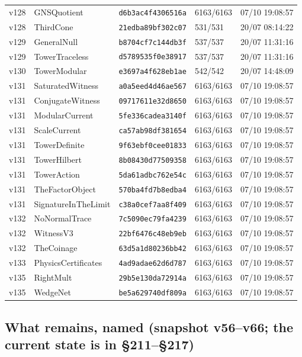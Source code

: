 \documentclass[11pt]{article}
\theoremstyle{definition}\newtheorem{deriv}{Derivation}
\begin{document}
{\begin{longtable}{@{}lllll@{}}
v128 & GNSQuotient & \texttt{d6b3ac4f4306516a} & 6163/6163 & 07/10 19:08:57 \\
v128 & ThirdCone & \texttt{21edba89bf302c07} & 531/531 & 20/07 08:14:22 \\
v129 & GeneralNull & \texttt{b8704cf7c144db3f} & 537/537 & 20/07 11:31:16 \\
v129 & TowerTraceless & \texttt{d5789535f0e38917} & 537/537 & 20/07 11:31:16 \\
v130 & TowerModular & \texttt{e3697a4f628eb1ae} & 542/542 & 20/07 14:48:09 \\
v131 & SaturatedWitness & \texttt{a0a5eed4d46ae567} & 6163/6163 & 07/10 19:08:57 \\
v131 & ConjugateWitness & \texttt{09717611e32d8650} & 6163/6163 & 07/10 19:08:57 \\
v131 & ModularCurrent & \texttt{5fe336cadea3140f} & 6163/6163 & 07/10 19:08:57 \\
v131 & ScaleCurrent & \texttt{ca57ab98df381654} & 6163/6163 & 07/10 19:08:57 \\
v131 & TowerDefinite & \texttt{9f63ebf0cee01833} & 6163/6163 & 07/10 19:08:57 \\
v131 & TowerHilbert & \texttt{8b08430d77509358} & 6163/6163 & 07/10 19:08:57 \\
v131 & TowerAction & \texttt{5da61adbc762e54c} & 6163/6163 & 07/10 19:08:57 \\
v131 & TheFactorObject & \texttt{570ba4fd7b8edba4} & 6163/6163 & 07/10 19:08:57 \\
v131 & SignatureInTheLimit & \texttt{c38a0cef7aa8f409} & 6163/6163 & 07/10 19:08:57 \\
v132 & NoNormalTrace & \texttt{7c5090ec79fa4239} & 6163/6163 & 07/10 19:08:57 \\
v132 & WitnessV3 & \texttt{22bf6476c48eb9eb} & 6163/6163 & 07/10 19:08:57 \\
v132 & TheCoinage & \texttt{63d5a1d80236bb42} & 6163/6163 & 07/10 19:08:57 \\
v133 & PhysicsCertificates & \texttt{4ad9adae62d6d787} & 6163/6163 & 07/10 19:08:57 \\
v135 & RightMult & \texttt{29b5e130da72914a} & 6163/6163 & 07/10 19:08:57 \\
v135 & WedgeNet & \texttt{be5a629740df809a} & 6163/6163 & 07/10 19:08:57 \\
\bottomrule\end{longtable}}

\subsection*{What remains, named (snapshot v56--v66; the current state is in \S211--\S217)}
\end{document}
